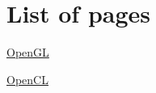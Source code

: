 \section*{List of pages}


\begin{DoxyItemize}
\item \mbox{\hyperlink{md___users__erik__documents__p_r_o_j_e_c_t_s__bookhouse_boys_ezor__neutrino__docs__documentation_opengl}{Open\+GL}}
\item \mbox{\hyperlink{md___users__erik__documents__p_r_o_j_e_c_t_s__bookhouse_boys_ezor__neutrino__docs__documentation_opencl}{Open\+CL}} 
\end{DoxyItemize}